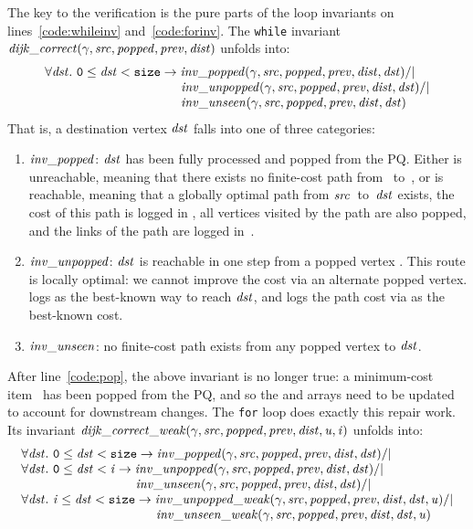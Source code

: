 The key to the verification is the pure parts of the loop
invariants on lines~\ref{code:whileinv} and~\ref{code:forinv}.  The \texttt{while} invariant $\mathit{dijk\_correct}(\gamma, \mathit{src}, \mathit{popped}, \mathit{prev}, \mathit{dist})$ unfolds into:
\[
\begin{array}{l}
\forall \m{dst}.~\texttt{0} \le \m{dst} < \texttt{size} -> \m{inv\_popped}(\gamma, \m{src}, \m{popped}, \m{prev}, \m{dist}, \m{dst}) /| \null \\
\hspace{10.7em}\m{inv\_unpopped}(\gamma, \m{src}, \m{popped}, \m{prev}, \m{dist}, \m{dst}) /| \null \\
\hspace{10.7em}\m{inv\_unseen}(\gamma, \m{src}, \m{popped}, \m{prev}, \m{dist}, \m{dst})
\end{array}
\]
That is, a destination vertex $\mathit{dst}$ falls into one of three
categories:
\begin{enumerate}
\item $\mathit{inv\_popped}$: $\mathit{dst}$ has been fully processed and
popped from the PQ.
Either  is unreachable, meaning that there exists no finite-cost path from 
~to~, or  is reachable, meaning that a globally optimal 
path from $\mathit{src}$~to~$\mathit{dst}$ exists, the cost of this path is logged in
, all vertices visited by the path are also popped,
and the links of the path are logged in~.
\item $\mathit{inv\_unpopped}$: $\mathit{dst}$ is reachable in
one step from a popped vertex .
This route is locally optimal: we cannot
improve the cost via an alternate popped vertex.
 logs
 as the best-known way to reach $\mathit{dst}$, and 
logs the path cost via  as the best-known cost.
\item $\mathit{inv\_unseen}$: no finite-cost path exists from any popped vertex to
$\mathit{dst}$.
\end{enumerate}
After line~\ref{code:pop}, 
the above invariant is no longer true: a minimum-cost item~ has been 
popped from the PQ, and so the  and  arrays need to be 
updated to account for downstream changes. The \texttt{for} loop does exactly this repair work.
Its invariant 
$\mathit{dijk\_correct\_weak}(\gamma, \mathit{src}, \mathit{popped}, \mathit{prev}, \mathit{dist}, \mathit{u}, \mathit{i})$ unfolds into:
\[
\begin{array}{l}
\forall \m{dst}.~\texttt{0} \le \m{dst} < \texttt{size} -> \m{inv\_popped}(\gamma, \m{src}, \m{popped}, \m{prev}, \m{dist}, \m{dst}) /| \null \\
\forall \m{dst}.~\texttt{0} \le \m{dst} < \m{i} -> \m{inv\_unpopped}(\gamma, \m{src}, \m{popped}, \m{prev}, \m{dist}, \m{dst}) /| \null \\
\hspace{9em}\m{inv\_unseen}(\gamma, \m{src}, \m{popped}, \m{prev}, \m{dist}, \m{dst}) /| \null \\
\forall \m{dst}.~\m{i} \le \m{dst} < \texttt{size} -> \m{inv\_unpopped\_weak}(\gamma, \m{src}, \m{popped}, \m{prev}, \m{dist}, \m{dst}, \m{u}) /| \null \\
\hspace{10.6em}\m{inv\_unseen\_weak}(\gamma, \m{src}, \m{popped}, \m{prev}, \m{dist}, \m{dst}, \m{u})
\end{array}
\]
